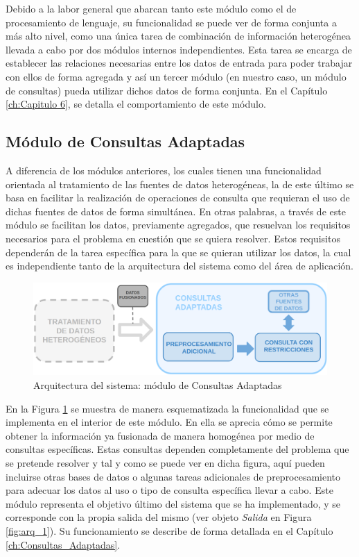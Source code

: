 Debido a la labor general que abarcan tanto este módulo como el de procesamiento de lenguaje, su funcionalidad se puede ver de forma conjunta a más alto nivel, como una única tarea de combinación de información heterogénea llevada a cabo por dos módulos internos independientes. Esta tarea se encarga de establecer las relaciones necesarias entre los datos de entrada para poder trabajar con ellos de forma agregada y así un tercer módulo (en nuestro caso, un módulo de consultas) pueda utilizar dichos datos de forma conjunta. En el Capítulo \ref{ch:Capitulo 6}, se detalla el comportamiento de este módulo.

\subsection{Módulo de Consultas Adaptadas}
A diferencia de los módulos anteriores, los cuales tienen una funcionalidad orientada al tratamiento de las fuentes de datos heterogéneas, la de este último se basa en facilitar la realización de operaciones de consulta que requieran el uso de dichas fuentes de datos de forma simultánea. En otras palabras, a través de este módulo se facilitan los datos, previamente agregados, que resuelvan los requisitos necesarios para el problema en cuestión que se quiera resolver. Estos requisitos dependerán de la tarea específica para la que se quieran utilizar los datos, la cual es independiente tanto de la arquitectura del sistema como del área de aplicación.

\begin{figure}[H]
    \centering
    \includegraphics[width=1.0\textwidth]{imagenes/arquitectura/modulo-consulta.png}
    \caption{Arquitectura del sistema: módulo de Consultas Adaptadas}
    \label{fig:arq_application}
\end{figure}

En la Figura \ref{fig:arq_application} se muestra de manera esquematizada la funcionalidad que se implementa en el interior de este módulo. En ella se aprecia cómo se permite obtener la información ya fusionada de manera homogénea por medio de consultas específicas. Estas consultas dependen completamente del problema que se pretende resolver y tal y como se puede ver en dicha figura, aquí pueden incluirse otras bases de datos o algunas tareas adicionales de preprocesamiento para adecuar los datos al uso o tipo de consulta específica llevar a cabo. Este módulo representa el objetivo último del sistema que se ha implementado, y se corresponde con la propia salida del mismo (ver objeto \textit{Salida} en Figura \ref{fig:arq_1}). Su funcionamiento se describe de forma detallada en el Capítulo \ref{ch:Consultas_Adaptadas}.

